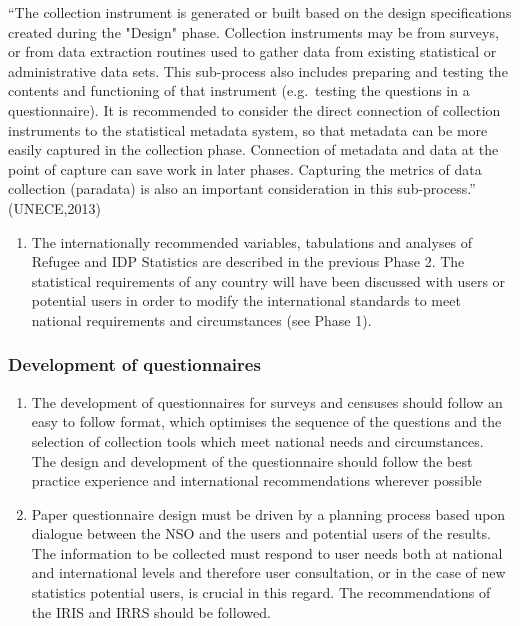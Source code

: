 \documentclass[
]{article}
\providecommand{\tightlist}{%
  \setlength{\itemsep}{0pt}\setlength{\parskip}{0pt}}
\begin{document}
``The collection instrument is generated or built based on the design
specifications created during the "Design" phase. Collection
instruments may be from surveys, or from data extraction routines used
to gather data from existing statistical or administrative data sets.
This sub-process also includes preparing and testing the contents and
functioning of that instrument (e.g.~testing the questions in a
questionnaire). It is recommended to consider the direct connection of
collection instruments to the statistical metadata system, so that
metadata can be more easily captured in the collection phase. Connection
of metadata and data at the point of capture can save work in later
phases. Capturing the metrics of data collection (paradata) is also an
important consideration in this sub-process.'' (UNECE,2013)

\begin{enumerate}
\def\labelenumi{\arabic{enumi}.}
\setcounter{enumi}{294}
\tightlist
\item
  The internationally recommended variables, tabulations and analyses
  of Refugee and IDP Statistics are described in the previous Phase 2.
  The statistical requirements of any country will have been discussed
  with users or potential users in order to modify the international
  standards to meet national requirements and circumstances (see Phase
  1).
\end{enumerate}

\hypertarget{development-of-questionnaires}{%
\subsubsection{Development of questionnaires}\label{development-of-questionnaires}}

\begin{enumerate}
\def\labelenumi{\arabic{enumi}.}
\setcounter{enumi}{295}
\item
  The development of questionnaires for surveys and censuses should
  follow an easy to follow format, which optimises the sequence of the
  questions and the selection of collection tools which meet national
  needs and circumstances. The design and development of the
  questionnaire should follow the best practice experience and
  international recommendations wherever possible
\item
  Paper questionnaire design must be driven by a planning process
  based upon dialogue between the NSO and the users and potential
  users of the results. The information to be collected must respond
  to user needs both at national and international levels and
  therefore user consultation, or in the case of new statistics
  potential users, is crucial in this regard. The recommendations of
  the IRIS and IRRS should be followed.
\end{enumerate}
\end{document}
